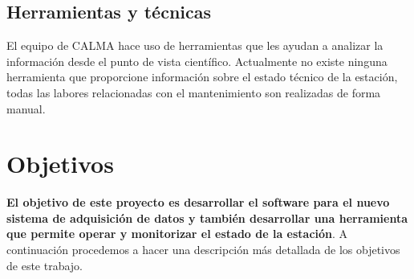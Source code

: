 	\subsection{Herramientas y técnicas}
		El equipo de CALMA hace uso de herramientas que les ayudan a analizar la información desde el punto de vista científico. Actualmente
		no existe ninguna herramienta que proporcione información sobre el estado técnico de la estación, todas las labores relacionadas con
		el mantenimiento son realizadas de forma manual.

\section{Objetivos}
	\textbf{El objetivo de este proyecto es desarrollar el software para el nuevo sistema de adquisición de datos y también desarrollar una
	herramienta que permite operar y monitorizar el estado de la estación}. A continuación procedemos a hacer una descripción más detallada de los
	objetivos de este trabajo.  

